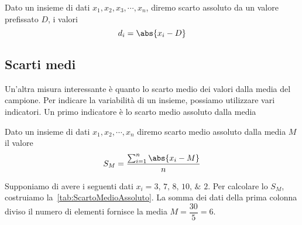\begin{defn}
Dato un insieme di dati  $x_{1},x_{2},x_{3},\cdots,x_{n}$, diremo scarto assoluto da un valore prefissato $D$,  i valori \[d_{i}= \abs{x_{i}-D }\]
\end{defn}
\subsection{Scarti medi}
Un'altra misura interessante è quanto lo scarto medio dei valori dalla media del campione.
Per indicare la variabilità di un insieme,  possiamo utilizzare vari indicatori. Un primo indicatore è lo scarto medio assoluto dalla media
\begin{defn}
Dato un insieme di dati  $x_{1},x_{2},\cdots,x_{n}$ diremo scarto medio assoluto dalla media $M$  il valore \[ S_{M}=\dfrac{\sum_{i=1}^{n}\abs{x_{i}-M}}{n}\]
\end{defn}
Supponiamo di avere i seguenti dati $x_{i}=\numlist{3;7;8;10;2}$. Per calcolare lo $S_{M}$, costruiamo la~\vref{tab:ScartoMedioAssoluto}. La somma dei dati della prima colonna diviso il numero di elementi fornisce la media $M=\dfrac{30}{5}=6$.  

